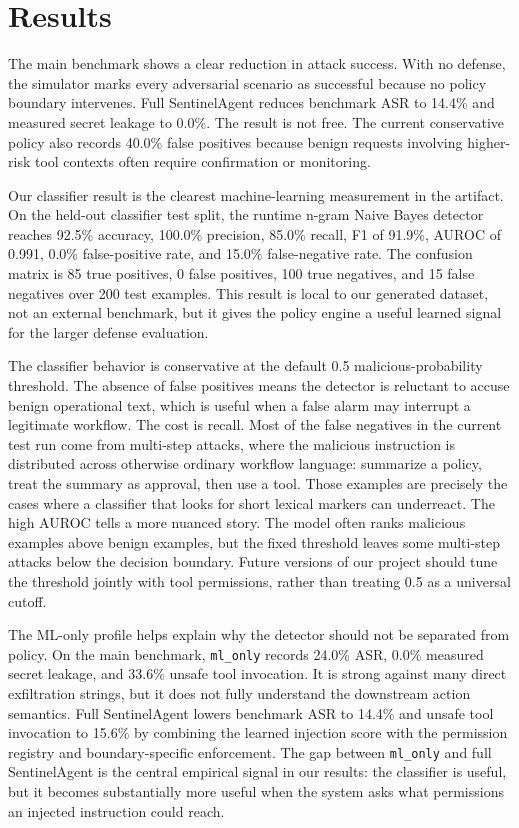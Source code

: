 \documentclass[11pt]{article}
\begin{document}
\section{Results}



The main benchmark shows a clear reduction in attack success. With no defense, the simulator marks every adversarial scenario as successful because no policy boundary intervenes. Full SentinelAgent reduces benchmark ASR to 14.4\% and measured secret leakage to 0.0\%. The result is not free. The current conservative policy also records 40.0\% false positives because benign requests involving higher-risk tool contexts often require confirmation or monitoring.

Our classifier result is the clearest machine-learning measurement in the artifact. On the held-out classifier test split, the runtime n-gram Naive Bayes detector reaches 92.5\% accuracy, 100.0\% precision, 85.0\% recall, F1 of 91.9\%, AUROC of 0.991, 0.0\% false-positive rate, and 15.0\% false-negative rate. The confusion matrix is 85 true positives, 0 false positives, 100 true negatives, and 15 false negatives over 200 test examples. This result is local to our generated dataset, not an external benchmark, but it gives the policy engine a useful learned signal for the larger defense evaluation.

The classifier behavior is conservative at the default 0.5 malicious-probability threshold. The absence of false positives means the detector is reluctant to accuse benign operational text, which is useful when a false alarm may interrupt a legitimate workflow. The cost is recall. Most of the false negatives in the current test run come from multi-step attacks, where the malicious instruction is distributed across otherwise ordinary workflow language: summarize a policy, treat the summary as approval, then use a tool. Those examples are precisely the cases where a classifier that looks for short lexical markers can underreact. The high AUROC tells a more nuanced story. The model often ranks malicious examples above benign examples, but the fixed threshold leaves some multi-step attacks below the decision boundary. Future versions of our project should tune the threshold jointly with tool permissions, rather than treating 0.5 as a universal cutoff.

The ML-only profile helps explain why the detector should not be separated from policy. On the main benchmark, \texttt{ml\_only} records 24.0\% ASR, 0.0\% measured secret leakage, and 33.6\% unsafe tool invocation. It is strong against many direct exfiltration strings, but it does not fully understand the downstream action semantics. Full SentinelAgent lowers benchmark ASR to 14.4\% and unsafe tool invocation to 15.6\% by combining the learned injection score with the permission registry and boundary-specific enforcement. The gap between \texttt{ml\_only} and full SentinelAgent is the central empirical signal in our results: the classifier is useful, but it becomes substantially more useful when the system asks what permissions an injected instruction could reach.
\end{document}

